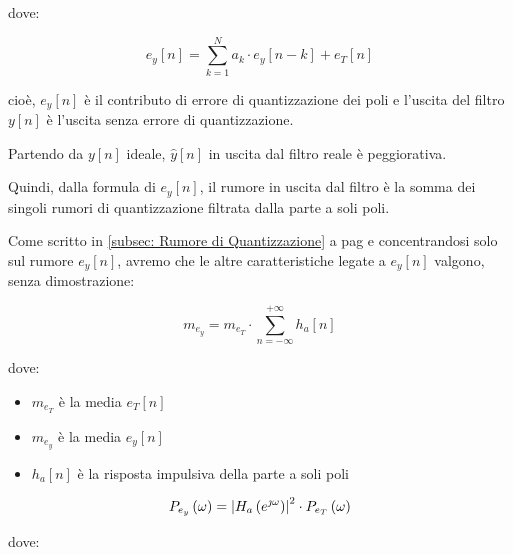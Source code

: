 dove: 

{
    \Large 
    \begin{equation}
        e_y \left[ n\right] 
        = 
        \sum_{k = 1}^{N} 
        a_{k} \cdot e_{y} \left[ n - k\right] 
        + 
        e_{T} \left[ n\right]
    \end{equation}
}

cioè, $e_y \left[ n\right]$ è il contributo di errore di quantizzazione dei poli e l'uscita del filtro $y \left[ n\right]$ è l'uscita senza errore di quantizzazione. \newline 

Partendo da $y \left[ n\right]$ ideale, $\hat{y} \left[ n\right]$ in uscita dal filtro reale è peggiorativa. \newline 

Quindi, dalla formula di $e_{y} \left[ n\right]$, il rumore in uscita dal filtro è la somma dei singoli rumori di quantizzazione filtrata dalla parte a soli poli. \newline 

Come scritto in \ref{subsec: Rumore di Quantizzazione}  a pag \pageref{subsec: Rumore di Quantizzazione} e concentrandosi solo sul rumore $e_{y} \left[ n\right]$, 
avremo che le altre caratteristiche legate a $e_{y} \left[ n\right]$ valgono, senza dimostrazione: 

{
    \Large 
    \begin{equation}
        m_{e_y} 
        = 
        m_{e_T} \cdot \sum_{n = - \infty}^{+ \infty} h_a \left[ n\right]
    \end{equation}
}

dove: 

\begin{itemize}
    \item $m_{e_T}$ è la media $e_T \left[ n\right]$ 
    \item $m_{e_y}$ è la media $e_y \left[ n\right]$
    \item $h_a \left[ n\right]$ è la risposta impulsiva della parte a soli poli 
\end{itemize} 

{
    \Large 
    \begin{equation}
        P_{e_y} \left(\omega\right) 
        = 
        \abs{H_a \left(e^{\jmath \omega}\right)}^{2} 
        \cdot 
        P_{e_T} \left(\omega\right)
    \end{equation}
}

dove: 


